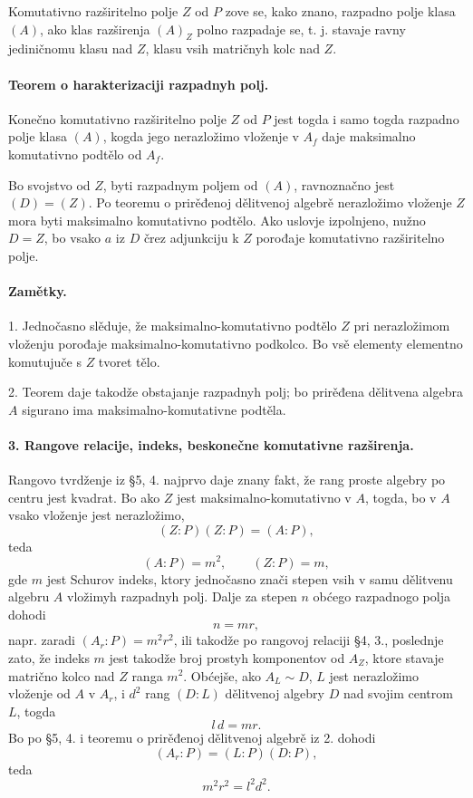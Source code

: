 \documentclass[11pt]{article}
\begin{document}
Komutativno razširitelno polje \(Z\) od \(P\) zove se, kako znano, razpadno polje klasa \((A)\), ako klas razširenja \((A)_Z\) polno razpadaje se, t. j. stavaje ravny jediničnomu klasu nad \(Z\), klasu vsih matričnyh kolc nad \(Z\).

\paragraph{Teorem o harakterizaciji razpadnyh polj.}
Konečno komutativno razširitelno polje \(Z\) od \(P\) jest togda i samo togda razpadno polje klasa \((A)\), kogda jego nerazložimo vloženje v \(A_f\) daje maksimalno komutativno podtělo od \(A_f\).

Bo svojstvo od \(Z\), byti razpadnym poljem od \((A)\), ravnoznačno jest \((D)=(Z)\). Po teoremu o prirěđenoj dělitvenoj algebrě nerazložimo vloženje \(Z\) mora byti maksimalno komutativno podtělo. Ako uslovje izpolnjeno, nužno \(D=Z\), bo vsako \(a\) iz \(D\) črez adjunkciju k \(Z\) porođaje komutativno razširitelno polje.

\paragraph{Zamětky.}
1. Jednočasno slěduje, že maksimalno-komutativno podtělo \(Z\) pri nerazložimom vloženju porođaje maksimalno-komutativno podkolco. Bo vsě elementy elementno komutujuče s \(Z\) tvoret tělo.

2. Teorem daje takodže obstajanje razpadnyh polj; bo prirěđena dělitvena algebra \(A\) sigurano ima maksimalno-komutativne podtěla.

\paragraph{3. Rangove relacije, indeks, beskonečne komutativne razširenja.}
Rangovo tvrdženje iz §5, 4. najprvo daje znany fakt, že rang proste algebry po centru jest kvadrat. Bo ako \(Z\) jest maksimalno-komutativno v \(A\), togda, bo v \(A\) vsako vloženje jest nerazložimo,
\[
        (Z:P)(Z:P)=(A:P),
\]
teda
\[
        (A:P)=m^2,\qquad (Z:P)=m,
\]
gde \(m\) jest Schurov indeks, ktory jednočasno znači stepen vsih v samu dělitvenu algebru \(A\) vložimyh razpadnyh polj. Dalje za stepen \(n\) obćego razpadnogo polja dohodi
\[
        n=mr,
\]
napr. zaradi \((A_r:P)=m^2r^2\), ili takodže po rangovoj relaciji §4, 3., poslednje zato, že indeks \(m\) jest takodže broj prostyh komponentov od \(A_Z\), ktore stavaje matrično kolco nad \(Z\) ranga \(m^2\). Obćejše, ako \(A_L\sim D\), \(L\) jest nerazložimo vloženje od \(A\) v \(A_r\), i \(d^2\) rang \((D:L)\) dělitvenoj algebry \(D\) nad svojim centrom \(L\), togda
\[
        l\,d=mr .
\]
Bo po §5, 4. i teoremu o prirěđenoj dělitvenoj algebrě iz 2. dohodi
\[
        (A_r:P)=(L:P)(D:P),
\]
teda
\[
        m^2r^2=l^2d^2 .
\]
\end{document}
